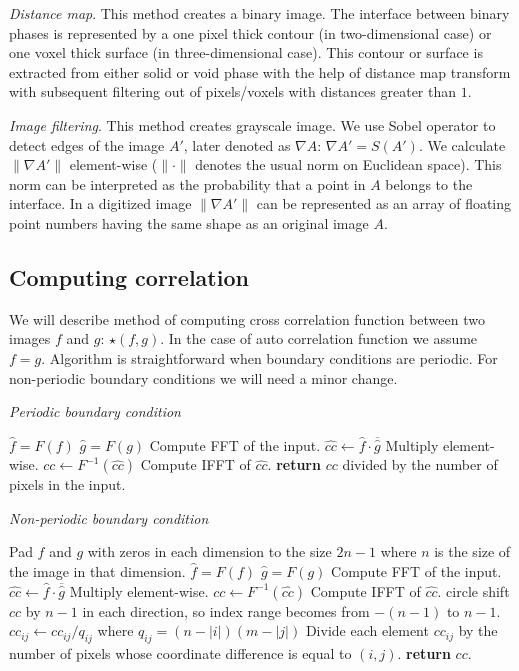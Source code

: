 \documentclass[reprint,amsmath,amssymb,aps,pre,showkeys,showpacs]{revtex4-1}
\begin{document}
\textit{Distance map}.
This method creates a binary image. The interface between binary phases is
represented by a one pixel thick contour (in two-dimensional case) or one voxel
thick surface (in three-dimensional case). This contour or surface is extracted
from either solid or void phase with the help of distance map transform with
subsequent filtering out of pixels/voxels with distances greater than $1$.

\textit{Image filtering}.
This method creates grayscale image. We use Sobel operator to detect edges of
the image $A'$, later denoted as $\nabla A$: $\nabla A' = S(A')$. We calculate
$\|\nabla A'\|$ element-wise ($\|\cdot\|$ denotes the usual norm on Euclidean
space). This norm can be interpreted as the probability that a point in $A$
belongs to the interface. In a digitized image $\|\nabla A'\|$ can be
represented as an array of floating point numbers having the same shape as an
original image $A$.

\subsection{Computing correlation}
We will describe method of computing cross correlation function between two
images $f$ and $g$: $\star (f, g)$. In the case of auto correlation function we
assume $f = g$. Algorithm is straightforward when boundary conditions are
periodic. For non-periodic boundary conditions we will need a minor change.

\textit{Periodic boundary condition}
\begin{algorithmic}[1]
  \State $\hat{f} = F(f)$
  \State $\hat{g} = F(g)$
  \Comment Compute FFT of the input.
  \State $\hat{cc} \gets \hat{f} \cdot \overline{\hat{g}}$
  \Comment Multiply element-wise.
  \State $cc \gets F^{-1}(\hat{cc})$
  \Comment Compute IFFT of $\hat{cc}$.
  \State \textbf{return} $cc$ divided by the number of pixels in the input.
  \EndProcedure
\end{algorithmic}

\textit{Non-periodic boundary condition}
\begin{algorithmic}[1]
  \State Pad $f$ and $g$ with zeros in each dimension to the size $2n-1$ where
  $n$ is the size of the image in that dimension.
  \State $\hat{f} = F(f)$
  \State $\hat{g} = F(g)$
  \Comment Compute FFT of the input.
  \State $\hat{cc} \gets \hat{f} \cdot \overline{\hat{g}}$
  \Comment Multiply element-wise.
  \State $cc \gets F^{-1}(\hat{cc})$
  \Comment Compute IFFT of $\hat{cc}$.
  \State circle shift $cc$ by $n - 1$ in each direction, so index range becomes
  from $-(n - 1)$ to $n - 1$.
  \State $cc_{ij} \gets cc_{ij} / q_{ij}$ where $q_{ij} = (n - |i|)(m - |j|)$
  \Comment Divide each element $cc_{ij}$ by the number of pixels whose
  coordinate difference is equal to $(i, j)$.
  \State \textbf{return} $cc$.
  \EndProcedure
\end{algorithmic}
\end{document}
